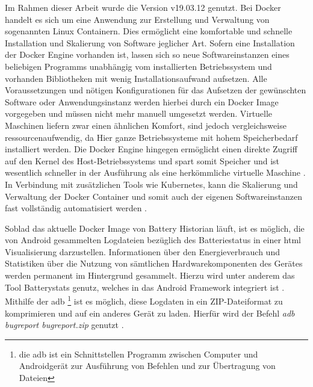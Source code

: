 Im Rahmen dieser Arbeit wurde die Version v19.03.12 genutzt. Bei Docker handelt es sich um eine Anwendung zur Erstellung und Verwaltung von sogenannten Linux Containern. Dies ermöglicht eine komfortable und schnelle Installation und Skalierung von Software jeglicher Art. Sofern eine Installation der Docker Engine vorhanden ist, lassen sich so neue Softwareinstanzen eines beliebigen Programms unabhängig vom installierten Betriebssystem und vorhanden Bibliotheken mit wenig Installationsaufwand aufsetzen. Alle Voraussetzungen und nötigen Konfigurationen für das Aufsetzen der gewünschten Software oder Anwendungsinstanz werden hierbei durch ein Docker Image vorgegeben und müssen nicht mehr manuell umgesetzt werden. Virtuelle Maschinen liefern zwar einen ähnlichen Komfort, sind jedoch vergleichsweise ressourcenaufwendig, da Hier ganze Betriebssysteme mit hohem Speicherbedarf installiert werden. Die Docker Engine hingegen ermöglicht einen direkte Zugriff auf den Kernel des Host-Betriebssystems und spart somit Speicher und ist wesentlich schneller in der Ausführung als eine herkömmliche virtuelle Maschine \cite{Docker}.  In Verbindung mit zusätzlichen Tools wie Kubernetes, kann die Skalierung und Verwaltung der Docker Container und somit auch der eigenen Softwareinstanzen fast vollständig automatisiert werden \cite{Kubernetes}.

Soblad das aktuelle Docker Image von Battery Historian läuft, ist es möglich, die von Android gesammelten Logdateien bezüglich des Batteriestatus in einer \ac{html} Visualisierung darzustellen. Informationen über den Energieverbrauch und Statistiken über die Nutzung von sämtlichen Hardwarekomponenten des Gerätes werden permanent im Hintergrund gesammelt. Hierzu wird unter anderem das Tool Batterystats genutz, welches in das Android Framework integriert ist \cite{batteryhistorianandroid}. Mithilfe der \ac{adb} \footnote{die \ac{adb} ist ein Schnittstellen Programm zwischen Computer und Androidgerät zur Ausführung von Befehlen und zur Übertragung von Dateien} ist es möglich, diese Logdaten in ein ZIP-Dateiformat zu komprimieren und auf ein anderes Gerät zu laden. Hierfür wird der Befehl \emph{adb bugreport bugreport.zip} genutzt \cite{batteryhistorian}. 

